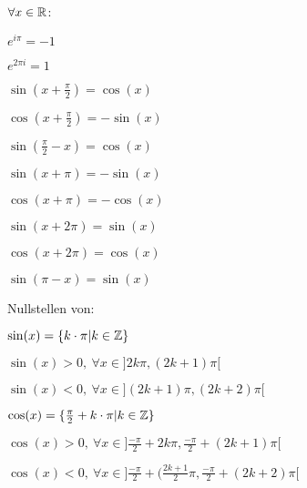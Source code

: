 $\forall x \in \mathbb{R}$:
\begin{compactenum}
    \item
        \begin{inparaitem}
            \item $e^{i \pi} = -1$
            \item $e^{2 \pi i} = 1$
        \end{inparaitem}
    \item
        \begin{inparaitem}
            \item $\sin(x + \frac{\pi}{2}) = \cos(x)$
            \item $\cos(x + \frac{\pi}{2}) = - \sin(x)$
        \end{inparaitem}
        \begin{compactenum}
            \item $\sin(\frac{\pi}{2} - x) = \cos(x)$
        \end{compactenum}
    \item
        \begin{inparaitem}
            \item $\sin(x + \pi) = - \sin(x)$
            \item $\cos(x + \pi) = - \cos(x)$
        \end{inparaitem}
    \item
        \begin{inparaitem}
            \item $\sin(x + 2 \pi) = \sin(x)$
            \item $\cos(x + 2 \pi) = \cos(x)$
        \end{inparaitem}
        \begin{compactenum}
            \item $\sin(\pi - x) = \sin(x)$
        \end{compactenum}
    \item Nullstellen von:
        \begin{compactitem}
            \item $\sin(x) = \{k \cdot \pi | k \in \mathbb{Z}\}$
                \begin{inparaitem}
                    \item $\sin(x) > 0, \ \forall x \in ] 2k \pi, (2k+1) \pi[$ 
                    \item $\sin(x) < 0, \ \forall x \in ](2k + 1) \pi, (2k+2) \pi[$
                \end{inparaitem}
            \item $\cos(x) = \{\frac{\pi}{2} + k \cdot \pi | k \in \mathbb{Z}\}$
                \begin{inparaitem}
                \item $\cos(x) > 0, \ \forall x \in ]\frac{-\pi}{2} + 2k\pi, \frac{-\pi}{2} + (2k+1) \pi[$
                \item $\cos(x) < 0, \ \forall x \in ]\frac{-\pi}{2} + (\frac{2k + 1}{2}\pi, \frac{-\pi}{2} + (2k+2) \pi[$
                \end{inparaitem}
        \end{compactitem}
\end{compactenum}


